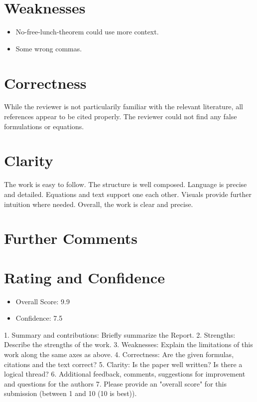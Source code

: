 \documentclass[a4paper]{scrartcl}
\begin{document}
\section*{Weaknesses}
\begin{itemize}
	\item No-free-lunch-theorem could use more context.
	\item Some wrong commas.
\end{itemize}




\section*{Correctness}
While the reviewer is not particularily familiar with the relevant literature, all references appear to be cited properly. The reviewer could not find any false formulations or equations.

\section*{Clarity}
The work is easy to follow. The structure is well composed. Language is precise and detailed. Equations and text support one each other. Visuals provide further intuition where needed. Overall, the work is clear and precise.

\section*{Further Comments}


\section*{Rating and Confidence}
\begin{itemize}
	\item Overall Score: 9.9
	\item Confidence: 7.5
\end{itemize}

1. Summary and contributions: Briefly summarize the Report.
2. Strengths: Describe the strengths of the work.
3. Weaknesses: Explain the limitations of this work along the same axes as above.
4. Correctness: Are the given formulas, citations and the text correct?
5. Clarity: Is the paper well written? Is there a logical thread?
6. Additional feedback, comments, suggestions for improvement and questions for the authors
7. Please provide an "overall score" for this submission (between 1 and 10 (10 is best)).



	
\end{document}
